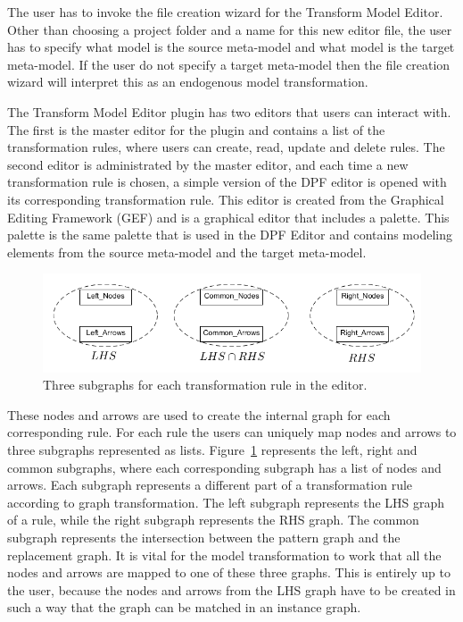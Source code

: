 The user has to invoke the file creation wizard for the Transform Model Editor.
Other than choosing a project folder and a name for this new editor file, the
user has to specify what model is the source meta-model and what model is the
target meta-model. If the user do not specify a target meta-model then the file
creation wizard will interpret this as an endogenous model transformation.

The Transform Model Editor plugin has two editors that users can interact with.
The first is the master editor for the plugin and contains a list of the
transformation rules, where users can create, read, update and delete rules. The
second editor is administrated by the master editor, and each time a new
transformation rule is chosen, a simple version of the DPF editor is opened
with its corresponding transformation rule. This editor is created from the 
Graphical Editing Framework (GEF) and is a graphical editor that includes a
palette. This palette is the same palette that is used in the DPF Editor and
contains modeling elements from the source meta-model and the target meta-model.

\begin{figure}[H]
	\centering
	\includegraphics[scale=0.7]{./Figures/left_common_right.png}
	\caption[The three subgraphs for a transformation rule.]
	{Three subgraphs for each transformation rule in the editor.}
	\label{fig:lists_editor}
\end{figure}

These nodes and arrows are used to create the internal graph for each
corresponding rule. For each rule the users can uniquely map nodes and arrows to
three subgraphs represented as lists. Figure~\ref{fig:lists_editor} represents
the left, right and common subgraphs, where each corresponding subgraph
has a list of nodes and arrows. Each subgraph represents a different part of a
transformation rule according to graph transformation. The left subgraph
represents the LHS graph of a rule, while the right subgraph represents the RHS
graph. The common subgraph represents the intersection between the pattern
graph and the replacement graph. It is vital for the model transformation to
work that all the nodes and arrows are mapped to one of these three graphs.
This is entirely up to the user, because the nodes and arrows from the LHS
graph have to be created in such a way that the graph can be matched in an
instance graph.

